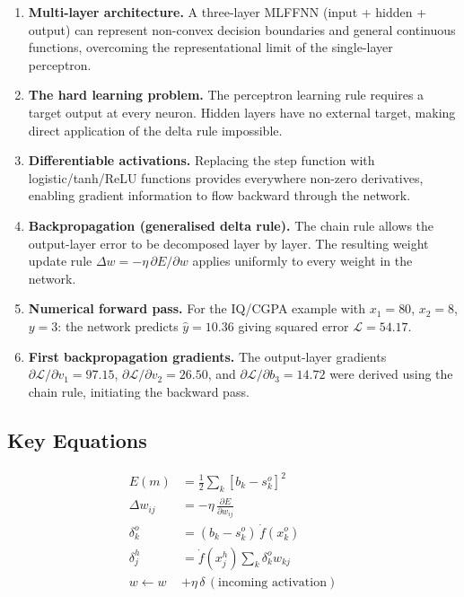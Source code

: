 \documentclass[12pt,a4paper]{article}
\newcommand{\Loss}{\mathcal{L}}
\newcommand{\yhat}{\hat{y}}
\begin{document}
\begin{enumerate}[label=\textbf{\arabic*.}]
  \item \textbf{Multi-layer architecture.}  A three-layer MLFFNN (input +
    hidden + output) can represent non-convex decision boundaries and general
    continuous functions, overcoming the representational limit of the
    single-layer perceptron.

  \item \textbf{The hard learning problem.}  The perceptron learning rule
    requires a target output at every neuron.  Hidden layers have no external
    target, making direct application of the delta rule impossible.

  \item \textbf{Differentiable activations.}  Replacing the step function with
    logistic/tanh/ReLU functions provides everywhere non-zero derivatives,
    enabling gradient information to flow backward through the network.

  \item \textbf{Backpropagation (generalised delta rule).}  The chain rule
    allows the output-layer error to be decomposed layer by layer.  The
    resulting weight update rule $\Delta w = -\eta\,\partial E/\partial w$
    applies uniformly to every weight in the network.

  \item \textbf{Numerical forward pass.}  For the IQ/CGPA example with
    $x_1=80$, $x_2=8$, $y=3$: the network predicts $\yhat = 10.36$ giving
    squared error $\Loss = 54.17$.

  \item \textbf{First backpropagation gradients.}  The output-layer gradients
    $\partial\Loss/\partial v_1 = 97.15$, $\partial\Loss/\partial v_2 = 26.50$,
    and $\partial\Loss/\partial b_3 = 14.72$ were derived using the chain rule,
    initiating the backward pass.
\end{enumerate}

\subsection*{Key Equations}

\begin{align}
  E(m)              &= \tfrac{1}{2}\sum_k [b_k - s_k^o]^2
                     \tag{Error} \\
  \Delta w_{ij}     &= -\eta\,\frac{\partial E}{\partial w_{ij}}
                     \tag{Gradient Descent} \\
  \delta_k^o        &= (b_k - s_k^o)\,\dot{f}(x_k^o)
                     \tag{Output Delta} \\
  \delta_j^h        &= \dot{f}(x_j^h)\sum_k \delta_k^o w_{kj}
                     \tag{Hidden Delta} \\
  w \leftarrow w    &+ \eta\,\delta\,(\text{incoming activation})
                     \tag{Weight Update}
\end{align}
\end{document}
